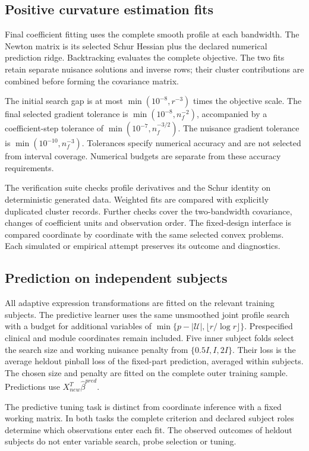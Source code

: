 \subsection{Positive curvature estimation fits}

Final coefficient fitting uses the complete smooth profile at each
bandwidth. The Newton matrix is its selected Schur Hessian plus the
declared numerical prediction ridge. Backtracking evaluates the
complete objective. The two fits retain separate nuisance solutions
and inverse rows; their cluster contributions are combined before
forming the covariance matrix.

The initial search gap is at most
$\min(10^{-8},r^{-3})$ times the objective scale. The final selected
gradient tolerance is $\min(10^{-8},n_f^{-2})$, accompanied by a
coefficient-step tolerance of $\min(10^{-7},n_f^{-3/2})$.
The nuisance gradient tolerance is
$\min(10^{-10},n_f^{-3})$. Tolerances specify numerical accuracy and
are not selected from interval coverage. Numerical budgets are
separate from these accuracy requirements.

The verification suite checks profile derivatives and the Schur
identity on deterministic generated data. Weighted fits are compared
with explicitly duplicated cluster records. Further checks cover the
two-bandwidth covariance, changes of coefficient units and observation
order. The fixed-design interface is compared coordinate by coordinate
with the same selected convex problems. Each simulated or empirical
attempt preserves its outcome and diagnostics.

\subsection{Prediction on independent subjects}

All adaptive expression transformations are fitted on the relevant
training subjects. The predictive learner uses the same unsmoothed
joint profile search with a budget for additional variables of
$\min\{p-|\mathcal U|,\lfloor r/\log r\rfloor\}$.
Prespecified clinical and module coordinates remain included.
Five inner subject folds select the search size and working nuisance
penalty from $\{0.5I,I,2I\}$. Their loss is the average heldout
pinball loss of the fixed-part prediction, averaged within subjects.
The chosen size and penalty are fitted on the complete outer training
sample. Predictions use $X_{new}^T\widehat\beta^{pred}$.

The predictive tuning task is distinct from coordinate inference
with a fixed working matrix. In both tasks the complete criterion
and declared subject roles determine which observations enter each
fit. The observed outcomes of heldout subjects do not enter variable
search, probe selection or tuning.

